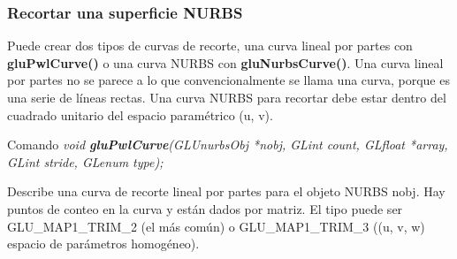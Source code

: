 \documentclass[10.5pt]{beamer}
\begin{document}


\begin{frame}[fragile]
\frametitle{Recortar una superficie NURBS}
\small
Puede crear dos tipos de curvas de recorte, una curva lineal por partes con
\textbf{gluPwlCurve()} o una curva NURBS con \textbf{gluNurbsCurve()}.
Una curva lineal por partes no se parece a lo que convencionalmente
se llama una curva, porque es una serie de líneas rectas. Una curva
NURBS para recortar debe estar dentro del cuadrado unitario del espacio
paramétrico (u, v).

\begin{alertblock}{Comando}
    \small
    \emph{void \textbf{gluPwlCurve}(GLUnurbsObj *nobj, GLint count, GLfloat *array,
    GLint stride, GLenum type);}
\end{alertblock}

Describe una curva de recorte lineal por partes para
el objeto NURBS nobj. Hay puntos de conteo en la curva y
están dados por matriz. El tipo puede ser\\GLU\_MAP1\_TRIM\_2
(el más común) o GLU\_MAP1\_TRIM\_3 ((u, v, w) espacio de
parámetros homogéneo).

\end{frame}

\end{document}
